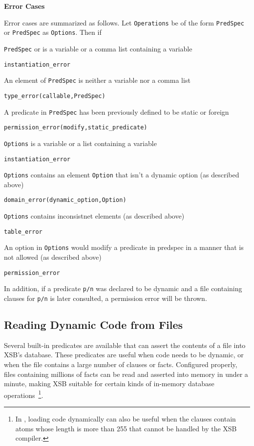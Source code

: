 \begin{description}
{\bf Error Cases} 

Error cases are summarized as follows.  Let {\tt Operations} be of the
form {\tt PredSpec} or {\tt PredSpec} as {\tt Options}.  Then if 
%
\bi
\item {\tt PredSpec} or is a variable or a comma list containing a variable
\bi
\item {\tt instantiation\_error}
\ei
\item An element of {\tt PredSpec} is neither a variable nor a comma
  list
\bi
\item 	{\tt type\_error(callable,PredSpec)}
\ei
\item 	A predicate in {\tt PredSpec} has been previously defined to be static or foreign
\bi
\item 	{\tt permission\_error(modify,static\_predicate)}
\ei
\item {\tt Options} is a variable or a list containing a variable
\bi
\item {\tt instantiation\_error}
\ei
\item {\tt Options} contains an element {\tt Option} that isn't a dynamic option (as described above)
\bi
\item {\tt domain\_error(dynamic\_option,Option)}
\ei
\item {\tt Options} contains inconsistnet elements (as described above)
\bi
\item {\tt table\_error}
\ei
\item An option in {\tt Options} would modify a predicate in predspec
  in a manner that is not allowed (as described above)
\bi
\item {\tt permission\_error}
\ei
\ei

In addition, if a predicate {\tt p/n} was declared to be dynamic and a
file containing clauses for {\tt p/n} is later consulted, a permission
error will be thrown.

\end{description}

\subsection{Reading Dynamic Code from Files} \label{sec:LoadDyn}

Several built-in predicates are available that can assert the contents
of a file into XSB's database.  These predicates are useful when code
needs to be dynamic, or when the file contains a large number of
clauses or facts.  Configured properly, files containing millions of
facts can be read and asserted into memory in under a minute, making
XSB suitable for certain kinds of in-memory database
operations~\footnote{In \version{}, loading code dynamically can also
be useful when the clauses contain atoms whose length is more than 255
that cannot be handled by the XSB compiler.}.  

